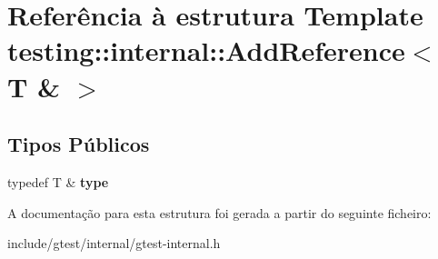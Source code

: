 \hypertarget{structtesting_1_1internal_1_1AddReference_3_01T_01_6_01_4}{\section{Referência à estrutura Template testing\-:\-:internal\-:\-:Add\-Reference$<$ T \& $>$}
\label{structtesting_1_1internal_1_1AddReference_3_01T_01_6_01_4}
}
\subsection*{Tipos Públicos}
\begin{DoxyCompactItemize}
\item 
\hypertarget{structtesting_1_1internal_1_1AddReference_3_01T_01_6_01_4_a93c064cdcdaced0abd167258425e57af}{typedef T \& {\bfseries type}}\label{structtesting_1_1internal_1_1AddReference_3_01T_01_6_01_4_a93c064cdcdaced0abd167258425e57af}

\end{DoxyCompactItemize}


A documentação para esta estrutura foi gerada a partir do seguinte ficheiro\-:\begin{DoxyCompactItemize}
\item 
include/gtest/internal/gtest-\/internal.\-h\end{DoxyCompactItemize}
